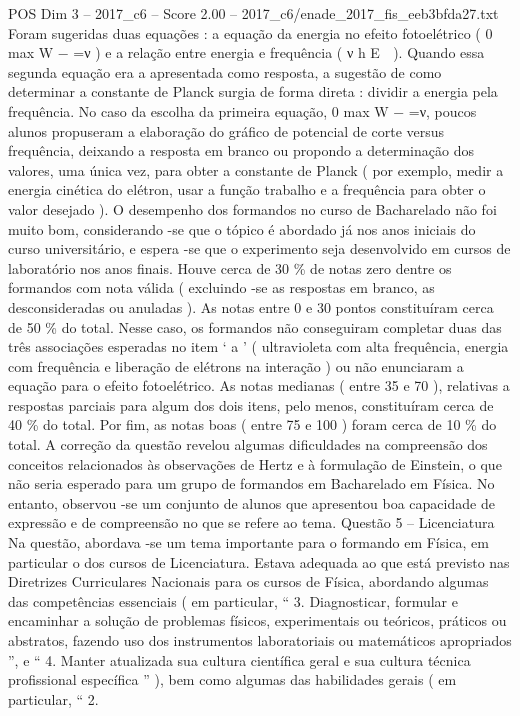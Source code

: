 \begin{textsample}{POS Dim 3 – 2017\_c6 – Score 2.00 – 2017\_c6/enade\_2017\_fis\_eeb3bfda27.txt}
Foram sugeridas duas equações : a equação da energia no efeito fotoelétrico ( 0 max W − =ν ) e a relação entre energia e frequência ( ν h E  ).
Quando essa segunda equação era a apresentada como resposta, a sugestão de como determinar a constante de Planck surgia de forma direta : dividir a energia pela frequência.
No caso da escolha da primeira equação, 0 max W − =ν, poucos alunos propuseram a elaboração do gráfico de potencial de corte versus frequência, deixando a resposta em branco ou propondo a determinação dos valores, uma única vez, para obter a constante de Planck ( por exemplo, medir a energia cinética do elétron, usar a função trabalho e a frequência para obter o valor desejado ).
O desempenho dos formandos no curso de Bacharelado não foi muito bom, considerando -se que o tópico é abordado já nos anos iniciais do curso universitário, e espera -se que o experimento seja desenvolvido em cursos de laboratório nos anos finais.
Houve cerca de 30 \% de notas zero dentre os formandos com nota válida ( excluindo -se as respostas em branco, as desconsideradas ou anuladas ).
As notas entre 0 e 30 pontos constituíram cerca de 50 \% do total.
Nesse caso, os formandos não conseguiram completar duas das três associações esperadas no item ‘ a ’ ( ultravioleta com alta frequência, energia com frequência e liberação de elétrons na interação ) ou não enunciaram a equação para o efeito fotoelétrico.
As notas medianas ( entre 35 e 70 ), relativas a respostas parciais para algum dos dois itens, pelo menos, constituíram cerca de 40 \% do total.
Por fim, as notas boas ( entre 75 e 100 ) foram cerca de 10 \% do total.
A correção da questão revelou algumas dificuldades na compreensão dos conceitos relacionados às observações de Hertz e à formulação de Einstein, o que não seria esperado para um grupo de formandos em Bacharelado em Física.
No entanto, observou -se um conjunto de alunos que apresentou boa capacidade de expressão e de compreensão no que se refere ao tema.
Questão 5 – Licenciatura Na questão, abordava -se um tema importante para o formando em Física, em particular o dos cursos de Licenciatura.
Estava adequada ao que está previsto nas Diretrizes Curriculares Nacionais para os cursos de Física, abordando algumas das competências essenciais ( em particular, “ 3.
Diagnosticar, formular e encaminhar a solução de problemas físicos, experimentais ou teóricos, práticos ou abstratos, fazendo uso dos instrumentos laboratoriais ou matemáticos apropriados ”, e “ 4.
Manter atualizada sua cultura científica geral e sua cultura técnica profissional específica ” ), bem como algumas das habilidades gerais ( em particular, “ 2.

\end{textsample}
